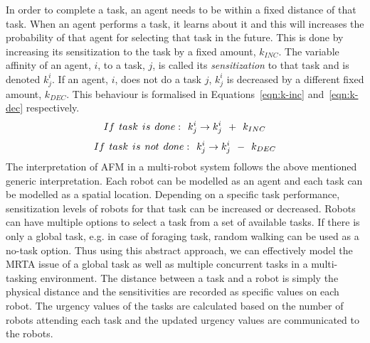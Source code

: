 \documentclass[smallcondensed]{svjour3}
\begin{document}
In order to complete a task, an agent needs to be within a fixed distance of that task.  When an agent performs a task, it learns about it and this will increases the probability of that agent for selecting that task in the future.  This is done by increasing its sensitization to the task by a fixed amount, $k_{INC}$. The variable affinity of an agent, $i$, to a task, $j$, is called its {\em sensitization} to that task and is denoted $k^{i}_{j}$.  If an agent, $i$, does not do a task $j$, $k^i_j$ is decreased by a different fixed amount, $k_{DEC}$.  This behaviour is formalised in Equations~\ref{eqn:k-inc} and~\ref{eqn:k-dec} respectively.
\begin{equation}
 If\hspace*{0.15cm}task\hspace*{0.15cm}is\hspace*{0.15cm}done:\hspace*{0.15cm}  k^i_j \rightarrow   k^i_j \hspace*{0.15cm} + \hspace*{0.15cm} k_{INC}
\label{eqn:k-inc}
\end{equation}
\begin{equation}
 If\hspace*{0.15cm}task\hspace*{0.15cm}is\hspace*{0.15cm}not\hspace*{0.15cm}done:\hspace*{0.15cm}  k^i_j \rightarrow   k^i_j \hspace*{0.15cm} - \hspace*{0.15cm} k_{DEC}
\label{eqn:k-dec}
\end{equation}
The interpretation of AFM in a multi-robot system follows the above mentioned generic interpretation. Each robot can be modelled as an agent and each task can be modelled as a spatial location. Depending on a specific task performance, sensitization levels of robots for that task can be increased or decreased. Robots can have multiple options to select a task from a set of available tasks. If there is only a global task, e.g. in case of foraging task, random walking can be used as a no-task option. Thus using this abstract approach, we can effectively model the MRTA issue of a global task as well as multiple concurrent tasks in a multi-tasking environment. The distance between a task and a robot is simply the physical distance and the sensitivities are recorded as specific values on each robot. The urgency values of the tasks are calculated based on the number of robots attending each task and the updated urgency values are communicated to the robots.
\end{document}
